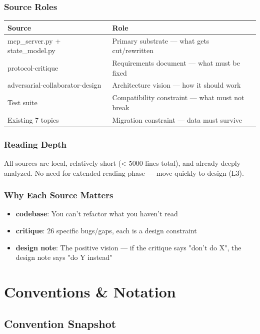 \documentclass[11pt,a4paper]{article}
\begin{document}
\subsubsection*{Source Roles}

\begin{tabular}{ll}
\toprule
Source & Role \\
\midrule
mcp\_server.py + state\_model.py & Primary substrate — what gets cut/rewritten \\
protocol-critique & Requirements document — what must be fixed \\
adversarial-collaborator-design & Architecture vision — how it should work \\
Test suite & Compatibility constraint — what must not break \\
Existing 7 topics & Migration constraint — data must survive \\
\bottomrule
\end{tabular}

\subsubsection*{Reading Depth}

All sources are local, relatively short (< 5000 lines total), and already deeply analyzed. No need for extended reading phase — move quickly to design (L3).

\subsubsection*{Why Each Source Matters}

\begin{itemize}
\item \textbf{codebase}: You can't refactor what you haven't read
\item \textbf{critique}: 26 specific bugs/gaps, each is a design constraint
\item \textbf{design note}: The positive vision — if the critique says "don't do X", the design note says "do Y instead"
\end{itemize}


\section{Conventions \& Notation}

\subsection*{Convention Snapshot}
\end{document}
